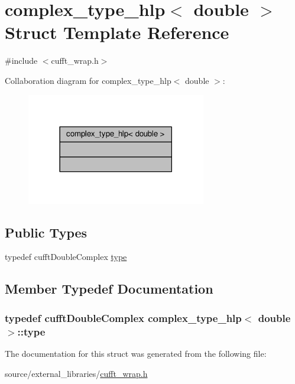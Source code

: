 \hypertarget{structcomplex__type__hlp_3_01double_01_4}{\section{complex\-\_\-type\-\_\-hlp$<$ double $>$ Struct Template Reference}
\label{structcomplex__type__hlp_3_01double_01_4}
}


{\ttfamily \#include $<$cufft\-\_\-wrap.\-h$>$}



Collaboration diagram for complex\-\_\-type\-\_\-hlp$<$ double $>$\-:\nopagebreak
\begin{figure}[H]
\begin{center}
\leavevmode
\includegraphics[width=222pt]{structcomplex__type__hlp_3_01double_01_4__coll__graph}
\end{center}
\end{figure}
\subsection*{Public Types}
\begin{DoxyCompactItemize}
\item 
typedef cufft\-Double\-Complex \hyperlink{structcomplex__type__hlp_3_01double_01_4_ab7bf6a2f6317b455665124fe54c356e2}{type}
\end{DoxyCompactItemize}


\subsection{Member Typedef Documentation}
\hypertarget{structcomplex__type__hlp_3_01double_01_4_ab7bf6a2f6317b455665124fe54c356e2}{
\subsubsection[{type}]{\setlength{\rightskip}{0pt plus 5cm}typedef cufft\-Double\-Complex {\bf complex\-\_\-type\-\_\-hlp}$<$ double $>$\-::{\bf type}}}\label{structcomplex__type__hlp_3_01double_01_4_ab7bf6a2f6317b455665124fe54c356e2}


The documentation for this struct was generated from the following file\-:\begin{DoxyCompactItemize}
\item 
source/external\-\_\-libraries/\hyperlink{cufft__wrap_8h}{cufft\-\_\-wrap.\-h}\end{DoxyCompactItemize}
